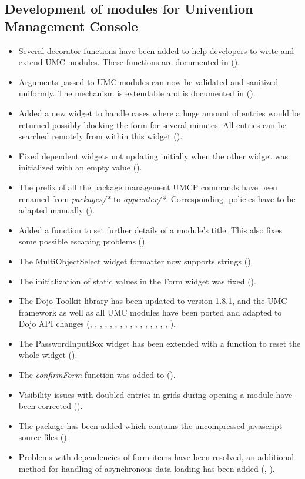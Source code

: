 \subsection{Development of modules for Univention Management Console}
\begin{itemize}
\item Several decorator functions have been added to help developers to write
  and extend UMC modules. These functions are documented in
   ().
\item Arguments passed to UMC modules can now be validated and sanitized
  uniformly. The mechanism is extendable and is documented in
   ().
\item Added a new widget to handle cases where a huge amount of entries
  would be returned possibly blocking the form for several minutes. All
  entries can be searched remotely from within this widget ().
\item Fixed dependent widgets not updating initially when the other widget was
  initialized with an empty value ().
\item The prefix of all the package management UMCP commands have been
  renamed from \emph{packages/*} to \emph{appcenter/*}.
  Corresponding -policies have to be adapted manually
  ().
\item Added a function to set further details of a module's title. This also
  fixes some possible escaping problems ().
\item The MultiObjectSelect widget formatter now supports strings ().
\item The initialization of static values in the Form widget was fixed
  ().
\item The Dojo Toolkit library has been updated to version 1.8.1, and the UMC
  framework as well as all UMC modules have been ported and adapted to Dojo
  API changes (, , ,
  , , , ,
  , , , ,
  , , , ,
  , ).
\item The PasswordInputBox widget has been extended with a function to
  reset the whole widget ().
\item The \emph{confirmForm} function was added to
   ().
\item Visibility issues with doubled entries in grids during opening a
  module have been corrected ().
\item The package
   has been added
  which contains the uncompressed javascript source files
  ().
\item Problems with dependencies of form items have been resolved, an
  additional method for handling of asynchronous data loading has been
  added (, ).
\end{itemize}




